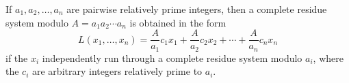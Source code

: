 If $a_1, a_2, \ldots, a_n$ are pairwise relatively prime integers, then a complete residue system modulo $A = a_1 a_2 \cdots a_n$ is obtained in the form
$$L(x_1, \ldots, x_n) = \frac{A}{a_1} c_1 x_1 + \frac{A}{a_2} c_2 x_2 + \cdots + \frac{A}{a_n} c_n x_n$$
if the $x_i$ independently run through a complete residue system modulo $a_i$, where the $c_i$ are arbitrary integers relatively prime to $a_i$.
